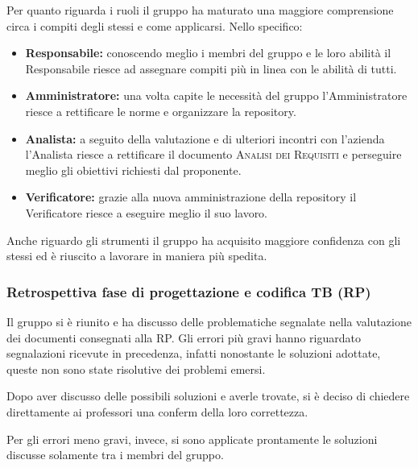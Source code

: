 \documentclass[../piano_di_qualifica.tex]{subfiles}
\begin{document}
Per quanto riguarda i ruoli il gruppo ha maturato una maggiore comprensione circa i compiti degli stessi e come applicarsi. Nello specifico:
\begin{itemize}
	\item \textbf{Responsabile:} conoscendo meglio i membri del gruppo e le loro abilità il Responsabile riesce ad assegnare compiti più in linea con le abilità di tutti.
	\item \textbf{Amministratore:} una volta capite le necessità del gruppo l'Amministratore riesce a rettificare le norme e organizzare la repository.
	\item \textbf{Analista:} a seguito della valutazione e di ulteriori incontri con l'azienda l'Analista riesce a rettificare il documento \textsc{Analisi dei Requisiti} e perseguire meglio gli obiettivi richiesti dal proponente.
	\item \textbf{Verificatore:} grazie alla nuova amministrazione della repository il Verificatore riesce a eseguire meglio il suo lavoro.
\end{itemize}

Anche riguardo gli strumenti il gruppo ha acquisito maggiore confidenza con gli stessi ed è riuscito a lavorare in maniera più spedita.

\subsubsection{Retrospettiva fase di progettazione e codifica TB (RP)}
\label{par:retrospettiva-RP}

Il gruppo si è riunito e ha discusso delle problematiche segnalate nella valutazione dei documenti consegnati alla RP. 
Gli errori più gravi hanno riguardato segnalazioni ricevute in precedenza, infatti nonostante le soluzioni adottate, queste non sono state risolutive dei problemi emersi. 

Dopo aver discusso delle possibili soluzioni e averle trovate, si è deciso di chiedere direttamente ai professori una conferm della loro correttezza.

Per gli errori meno gravi, invece, si sono applicate prontamente le soluzioni discusse solamente tra i membri del gruppo.
\end{document}
